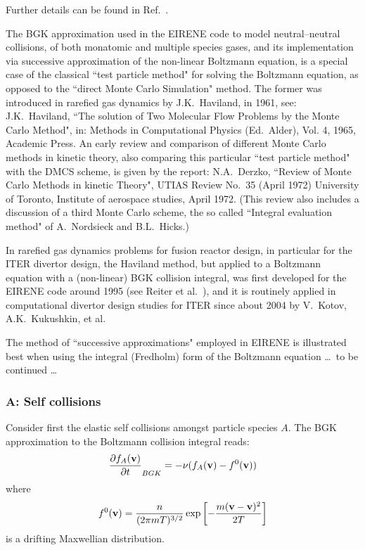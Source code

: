 Further details can be found in Ref.\ \cite{kn:Reiter96}.
\bigskip

The \ac{BGK} approximation used in the EIRENE code to model neutral--neutral
collisions, of both monatomic and multiple species gases, and its
implementation via successive approximation of the non-linear Boltzmann
equation, is a special case of the classical ``test particle method" for
solving the Boltzmann equation, as opposed to the ``direct Monte Carlo
Simulation" method.
The former was introduced in rarefied gas dynamics by J.K.~Haviland, in 1961,
see:
J.K.~Haviland, ``The solution of Two Molecular Flow Problems by the Monte Carlo
Method", in: Methods in Computational Physics (Ed.\ Alder), Vol.
4, 1965, Academic Press.
An early review and comparison of different Monte Carlo methods in kinetic
theory, also comparing this particular ``test particle method" with the
\ac{DMCS} scheme, is given by the report: N.A.~Derzko, ``Review of Monte Carlo
Methods in kinetic Theory", UTIAS Review No.\ 35 (April 1972) University of
Toronto, Institute of aerospace studies, April 1972.
(This review also includes a discussion of a third Monte Carlo scheme, the so
called ``Integral evaluation method" of A.~Nordsieck and B.L.~Hicks.)

In rarefied gas dynamics problems for fusion reactor design, in particular for
the ITER divertor design, the Haviland method, but applied to a Boltzmann
equation with a (non-linear) \ac{BGK} collision integral, was first developed
for the EIRENE code around 1995 (see Reiter et al.\ \cite{kn:Reiter96}), and it
is routinely applied in computational divertor design studies for ITER since
about 2004 by V.~Kotov, A.K.~Kukushkin, et al.

The method of ``successive approximations" employed in EIRENE is illustrated
best when using the integral (Fredholm) form of the Boltzmann equation \dots\
to be continued \dots 

\subsubsection{A: Self collisions} 

Consider first the elastic self collisions amongst particle species $A$.
The \ac{BGK} approximation to the Boltzmann collision integral reads:
\begin{equation}
  \frac{\partial f_A(\mathbf{v})}{\partial t}_{BGK}=-\nu (f_A(\mathbf{v})-f^0(\mathbf{v}))
\end{equation}
where
\begin{equation}
  f^0(\mathbf{v})=\frac{n}{(2\pi mT)^{3/2}} \exp\left[-\frac{m(\mathbf{v}-\mathbf{v})^2}{2T}\right]
\end{equation}
is a drifting Maxwellian distribution.

